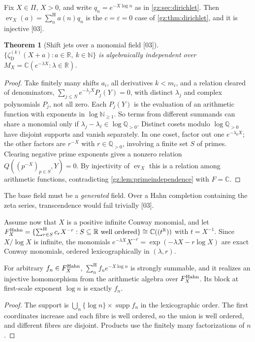 \documentclass[11pt,a4paper]{article}
\numberwithin{equation}{section}
\newtheorem{theorem}{Theorem}[section]
\theoremstyle{definition}
\theoremstyle{remark}
\newcommand{\R}{\mathbb R}
\newcommand{\C}{\mathbb C}
\newcommand{\Q}{\mathbb Q}
\newcommand{\N}{\mathbb N}
\newcommand{\eps}{\varepsilon}
\newcommand{\supp}{\operatorname{supp}}
\newcommand{\ev}{\operatorname{ev}}
\newcommand{\Sh}{\mathop{\textstyle\sum}\nolimits^{\mathrm H}}
\newcommand{\zD}{\zeta_{\mathrm D}}
\newcommand{\src}[1]{\textup{[#1]}}
\begin{document}
Fix $X\in\Pi$, $X>0$, and write $q_n=e^{-X\log n}$ as in \cref{gz:sec:dirichlet}.
Then $\ev_X(a)=\Sh_na(n)q_n$ is the $c=\eps=0$ case of
\cref{gz:thm:dirichlet}, and it is injective \src{03}.

\begin{theorem}[Shift jets over a monomial field \src{03}]\label{gz:thm:indep-monomial}
$\{\zD^{(k)}(X+a):a\in\R,\ k\in\N\}$ is algebraically independent over
$M_X=\C(e^{-\lambda X}:\lambda\in\R)$.
\end{theorem}
\begin{proof}
Take finitely many shifts $a_i$, all derivatives $k<m_i$, and a relation
cleared of denominators, $\sum_{j\le N}e^{-\lambda_jX}P_j(Y)=0$, with distinct
$\lambda_j$ and complex polynomials $P_j$, not all zero. Each $P_j(Y)$ is the
evaluation of an arithmetic function with exponents in $\log\N_{\ge1}$. So
terms from different summands can share a monomial only if
$\lambda_j-\lambda_\ell\in\log\Q_{>0}$. Distinct cosets modulo $\log\Q_{>0}$
have disjoint supports and vanish separately. In one coset, factor out one
$e^{-\lambda_0X}$; the other factors are $r^{-X}$ with $r\in\Q_{>0}$,
involving a finite set $S$ of primes. Clearing negative prime exponents
gives a nonzero relation $Q((p^{-X})_{p\in S},Y)=0$. By injectivity of
$\ev_X$ this is a relation among arithmetic functions, contradicting
\cref{gz:lem:primeindependence} with $F=\C$.
\end{proof}
The base field must be a \emph{generated} field. Over a Hahn completion
containing the zeta series, transcendence would fail trivially \src{03}.

Assume now that $X$ is a positive infinite Conway monomial, and let
$F^{\rm Hahn}_X=\{\Sh_{r\in S}c_rX^{-r}:S\subseteq\R\text{ well ordered}\}\cong\C((t^\R))$
with $t=X^{-1}$. Since $X/\log X$ is infinite, the monomials
$e^{-\lambda X}X^{-r}=\exp(-\lambda X-r\log X)$ are exact Conway monomials,
ordered lexicographically in $(\lambda,r)$.

\begin{lemma}[Slow coefficients \src{03}]\label{gz:lem:sloweval}
For arbitrary $f_n\in F^{\rm Hahn}_X$, $\Sh_nf_ne^{-X\log n}$ is strongly
summable, and it realizes an injective homomorphism from the arithmetic
algebra over $F^{\rm Hahn}_X$. Its block at first-scale exponent $\log n$
is exactly $f_n$.
\end{lemma}
\begin{proof}
The support is $\bigcup_n\{\log n\}\times\supp f_n$ in the lexicographic
order. The first coordinates increase and each fibre is well ordered, so the
union is well ordered, and different fibres are disjoint. Products use the
finitely many factorizations of $n$.
\end{proof}
\end{document}
